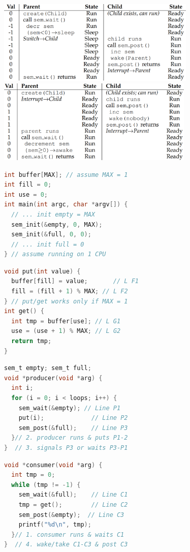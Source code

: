 \includegraphics[width=\linewidth,height=4cm]{imgs/pwaitschd}
\includegraphics[width=\linewidth,height=4cm]{imgs/chdwaitsp}
\begin{minipage}{.5\linewidth}
\begin{lstlisting}[language=c,xleftmargin=2pt,xrightmargin=2pt]
int buffer[MAX]; // assume MAX = 1
int fill = 0;
int use = 0;
int main(int argc, char *argv[]) {
  // ... init empty = MAX
  sem_init(&empty, 0, MAX);
  sem_init(&full, 0, 0);
  // ... init full = 0
} // assume running on 1 CPU
\end{lstlisting}
\end{minipage}
\begin{minipage}{.5\linewidth}
\begin{lstlisting}[language=c,xleftmargin=2pt,xrightmargin=2pt]
void put(int value) {
  buffer[fill] = value;       // L F1
  fill = (fill + 1) % MAX; // L F2
} // put/get works only if MAX = 1
int get() {
  int tmp = buffer[use]; // L G1
  use = (use + 1) % MAX; // L G2
  return tmp;
}
\end{lstlisting}
\end{minipage}
\begin{minipage}{.5\linewidth}
\begin{lstlisting}[language=c,xleftmargin=2pt,xrightmargin=2pt]
sem_t empty; sem_t full;
void *producer(void *arg) {
  int i;
  for (i = 0; i < loops; i++) {
    sem_wait(&empty); // Line P1
    put(i);             // Line P2
    sem_post(&full);    // Line P3
  }// 2. producer runs & puts P1-2
}  // 3. signals P3 or waits P3-P1
\end{lstlisting}
\end{minipage}
\begin{minipage}{.5\linewidth}
\begin{lstlisting}[language=c,xleftmargin=2pt,xrightmargin=2pt]
void *consumer(void *arg) {
  int tmp = 0;
  while (tmp != -1) {
    sem_wait(&full);    // Line C1
    tmp = get();        // Line C2
    sem_post(&empty);  // Line C3
    printf("%d\n", tmp);
  }// 1. consumer runs & waits C1
}  // 4. wake/take C1-C3 & post C3
\end{lstlisting}
\end{minipage}
